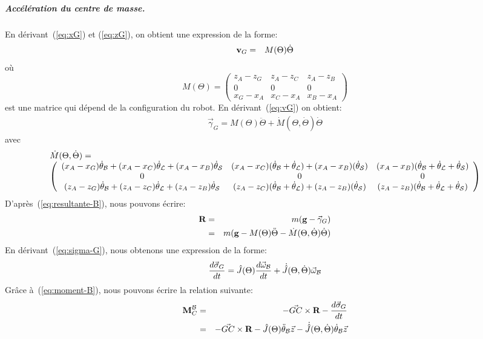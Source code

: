 \subparagraph{Accélération du centre de masse.}
En dérivant (\ref{eq:xG}) et (\ref{eq:zG}), on obtient une expression
de la forme:
\begin{eqnarray}
\label{eq:vG}
\textbf{v}_G &=& M(\Theta) \dot{\Theta}
\end{eqnarray}
où
$$
M(\Theta) =
\left(\begin{array}{ccc}
z_A-z_G & z_A-z_C & z_A-z_B \\
0 & 0 & 0 \\
x_G-x_A & x_C-x_A & x_B-x_A
\end{array}\right)
$$
est une matrice qui dépend de la configuration du robot.
En dérivant (\ref{eq:vG}) on obtient:
\begin{eqnarray}
\label{eq:gammaG}
\vec{\gamma}_G = M(\Theta)\ddot{\Theta} + \dot{M}(\Theta,\dot{\Theta})\dot{\Theta}
\end{eqnarray}
avec
{\tiny
$$
\begin{array}{l}
\dot{M}(\Theta,\dot{\Theta})=\\
\left(\begin{array}{ccc}
(x_A-x_G)\dot{\theta}_{\cal B}+(x_A-x_C)\dot{\theta}_{\cal
  L}+(x_A-x_B)\dot{\theta}_{\cal S} &
(x_A-x_C)(\dot{\theta}_{\cal B}+\dot{\theta}_{\cal L}) +
(x_A-x_B)(\dot{\theta}_{\cal S}) &
(x_A-x_B)(\dot{\theta}_{\cal B}+\dot{\theta}_{\cal
  L}+\dot{\theta}_{\cal S}) \\
0 & 0 & 0 \\
(z_A-z_G)\dot{\theta}_{\cal B}+(z_A-z_C)\dot{\theta}_{\cal
  L}+(z_A-z_B)\dot{\theta}_{\cal S} &
(z_A-z_C)(\dot{\theta}_{\cal B}+\dot{\theta}_{\cal L}) +
(z_A-z_B)(\dot{\theta}_{\cal S}) &
(z_A-z_B)(\dot{\theta}_{\cal B}+\dot{\theta}_{\cal
  L}+\dot{\theta}_{\cal S}) \\
\end{array}\right)
\end{array}
$$
}
D'après (\ref{eq:resultante-B}), nous pouvons écrire:
\begin{eqnarray}\label{eq:R-1}
\textbf{R} &=& m(\textbf{g} -\vec{\gamma}_G) \\
\label{eq:R-2}
&=& m(\textbf{g} - M(\Theta)\ddot{\Theta} - \dot{M}(\Theta,\dot{\Theta})\dot{\Theta})
\end{eqnarray}
En dérivant (\ref{eq:sigma-G}), nous obtenons une expression de la
forme:
$$
\frac{d\vec{\sigma}_G}{dt} = \hat{J}(\Theta) \frac{d\vec{\omega}_{\cal
    B}}{dt} + \dot{\hat{J}}(\Theta,\dot{\Theta})\vec{\omega}_{\cal B}
$$
Grâce à (\ref{eq:moment-B}), nous pouvons écrire la relation
suivante:
\begin{eqnarray}\label{eq:moment-C-1}
\textbf{M}^{\cal B}_C &=& -\vec{GC}\times \textbf{R} -
\frac{d\vec{\sigma}_G}{dt} \\
\label{eq:moment-C-2}
&=& -\vec{GC}\times \textbf{R} -
\hat{J}(\Theta) \ddot{\theta}_{\cal B} \vec{z} -
\dot{\hat{J}}(\Theta,\dot{\Theta})\dot{\theta}_{\cal B} \vec{z}
\end{eqnarray}
